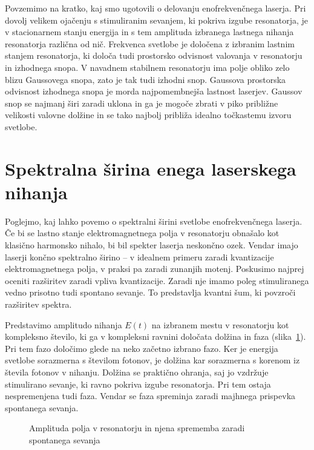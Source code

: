 Povzemimo na kratko, kaj smo ugotovili o delovanju enofrekvenčnega laserja. 
Pri dovolj velikem ojačenju s stimuliranim sevanjem, ki pokriva izgube 
resonatorja, je v stacionarnem stanju energija in s tem amplituda 
izbranega lastnega nihanja resonatorja različna od nič. Frekvenca svetlobe je
določena z izbranim lastnim stanjem resonatorja, ki določa tudi prostorsko
odvisnost valovanja v resonatorju in izhodnega snopa. V navadnem stabilnem 
resonatorju ima polje obliko zelo blizu Gaussovega snopa, zato je tak tudi izhodni snop.
Gaussova prostorska odvisnost izhodnega snopa je morda najpomembnejša lastnost
laserjev. Gaussov snop se najmanj širi zaradi uklona in ga je mogoče
zbrati v piko približne velikosti valovne dolžine in se tako najbolj
približa idealno točkastemu izvoru svetlobe.

\section{Spektralna širina enega laserskega nihanja}

Poglejmo, kaj lahko povemo o spektralni 
širini svetlobe enofrekvenčnega laserja. Če bi se lastno stanje 
elektromagnetnega polja v resonatorju obnašalo kot klasično 
harmonsko nihalo, bi bil spekter laserja neskončno ozek. Vendar 
imajo laserji končno spektralno širino -- v idealnem primeru zaradi
kvantizacije elektromagnetnega polja, v praksi pa zaradi zunanjih motenj.
Poskusimo najprej oceniti razširitev zaradi vpliva kvantizacije. Zaradi nje
imamo poleg stimuliranega vedno prisotno tudi spontano sevanje. To 
predstavlja kvantni šum, ki povzroči razširitev spektra. 

Predstavimo amplitudo nihanja $E(t)$ na izbranem mestu v resonatorju kot kompleksno 
število, ki ga v kompleksni ravnini določata dolžina in faza (slika~\ref{fig:fazor}). 
Pri tem fazo določimo glede na neko začetno izbrano fazo. 
Ker je energija svetlobe sorazmerna s številom fotonov, je dolžina 
kar sorazmerna s korenom iz števila fotonov v nihanju. Dolžina se praktično
ohranja, saj jo vzdržuje stimulirano sevanje, ki ravno pokriva
izgube resonatorja. Pri tem ostaja nespremenjena tudi faza. Vendar se
faza spreminja zaradi majhnega prispevka spontanega sevanja.

\begin{figure}[h]
\centering
\def\svgwidth{70truemm} 

\caption{Amplituda polja v resonatorju in njena sprememba zaradi 
spontanega sevanja}
\label{fig:fazor}
\end{figure}


